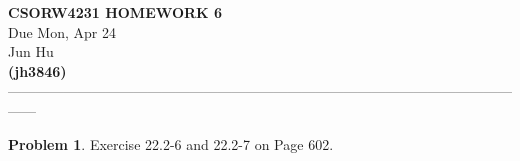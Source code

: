 \documentclass[11pt]{article}
\theoremstyle{definition}
\newtheorem{problem}{Problem}
\begin{document}
\begin{center}
\Large{} 
\textbf{CSORW4231 HOMEWORK 6} \\
\normalsize{}
Due Mon, Apr 24\\
\large{Jun Hu \\
\textbf{(jh3846)}} \\ 
------------------------------------------------------------------------------------------------------------------
\end{center}

\begin{problem}
\large{Exercise 22.2-6 and 22.2-7 on Page 602.}
\end{problem}
\end{document}
